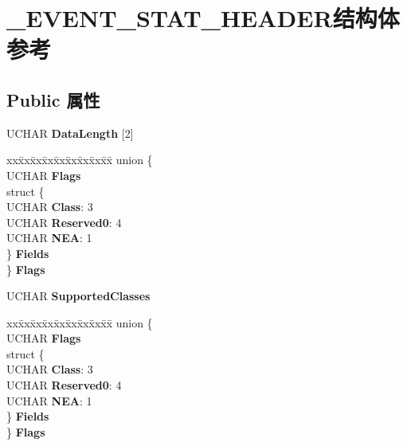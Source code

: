 \hypertarget{struct___e_v_e_n_t___s_t_a_t___h_e_a_d_e_r}{}\section{\+\_\+\+E\+V\+E\+N\+T\+\_\+\+S\+T\+A\+T\+\_\+\+H\+E\+A\+D\+E\+R结构体 参考}
\label{struct___e_v_e_n_t___s_t_a_t___h_e_a_d_e_r}
\subsection*{Public 属性}
\begin{DoxyCompactItemize}
\item 
\mbox{\label{struct___e_v_e_n_t___s_t_a_t___h_e_a_d_e_r_ad76002f5d2907768e4a59e4eb57a4668}} 
U\+C\+H\+AR {\bfseries Data\+Length} \mbox{[}2\mbox{]}
\item 
\mbox{\label{struct___e_v_e_n_t___s_t_a_t___h_e_a_d_e_r_add7f4ea987225fe14511e13ee9a6cbde}} 
\begin{tabbing}
xx\=xx\=xx\=xx\=xx\=xx\=xx\=xx\=xx\=\kill
union \{\\
\>UCHAR {\bfseries Flags}\\
\>struct \{\\
\>\>UCHAR {\bfseries Class}: 3\\
\>\>UCHAR {\bfseries Reserved0}: 4\\
\>\>UCHAR {\bfseries NEA}: 1\\
\>\} {\bfseries Fields}\\
\} {\bfseries Flags}\\

\end{tabbing}\item 
\mbox{\label{struct___e_v_e_n_t___s_t_a_t___h_e_a_d_e_r_aced01ddaf4b6b1ee878800400b7b64ad}} 
U\+C\+H\+AR {\bfseries Supported\+Classes}
\item 
\mbox{\label{struct___e_v_e_n_t___s_t_a_t___h_e_a_d_e_r_a564424c51e1764f13486a267bd01e83c}} 
\begin{tabbing}
xx\=xx\=xx\=xx\=xx\=xx\=xx\=xx\=xx\=\kill
union \{\\
\>UCHAR {\bfseries Flags}\\
\>struct \{\\
\>\>UCHAR {\bfseries Class}: 3\\
\>\>UCHAR {\bfseries Reserved0}: 4\\
\>\>UCHAR {\bfseries NEA}: 1\\
\>\} {\bfseries Fields}\\
\} {\bfseries Flags}\\

\end{tabbing}\end{DoxyCompactItemize}


